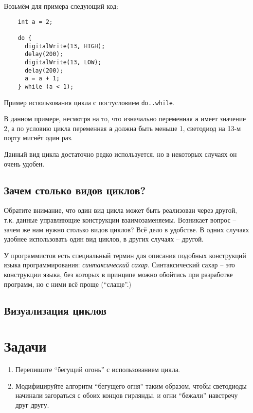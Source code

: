 \documentclass[../sparc.tex]{subfiles}
\begin{document}
Возьмём для примера следующий код:

\begin{listing}[ht]
  \begin{verbatim}
    int a = 2;

    do {
      digitalWrite(13, HIGH);
      delay(200);
      digitalWrite(13, LOW);
      delay(200);
      a = a + 1;
    } while (a < 1);
  \end{verbatim}
  \label{listing:dialogues-with-computer-do-while-example}
  \caption{Пример использования цикла с постусловием \texttt{do..while}.}
\end{listing}

В данном примере, несмотря на то, что изначально переменная \texttt{a} имеет
значение 2, а по условию цикла переменная \texttt{a} должна быть меньше 1,
светодиод на 13-м порту мигнёт один раз.

Данный вид цикла достаточно редко используется, но в некоторых случаях он очень
удобен.

\subsection{Зачем столько видов циклов?}

Обратите внимание, что один вид цикла может быть реализован через другой, т.к.
данные управляющие конструкции взаимозаменяемы. Возникает вопрос -- зачем же нам
нужно столько видов циклов? Всё дело в удобстве. В одних случаях удобнее
использовать один вид циклов, в других случаях -- другой.

У программистов есть специальный термин для описания подобных конструкций языка
программирования: \emph{синтаксический сахар}.  Синтаксический сахар -- это
конструкции языка, без которых в принципе можно обойтись при разработке
программ, но с ними всё проще (``слаще''.)

\subsection{Визуализация циклов}

\section{Задачи}
\begin{enumerate}
\item Перепишите ``бегущий огонь'' с использованием цикла.
\item Модифицируйте алгоритм ``бегущего огня'' таким образом, чтобы светодиоды
  начинали загораться с обоих концов гирлянды, и огни ``бежали'' навстречу друг
  другу.
\end{enumerate}
\end{document}
